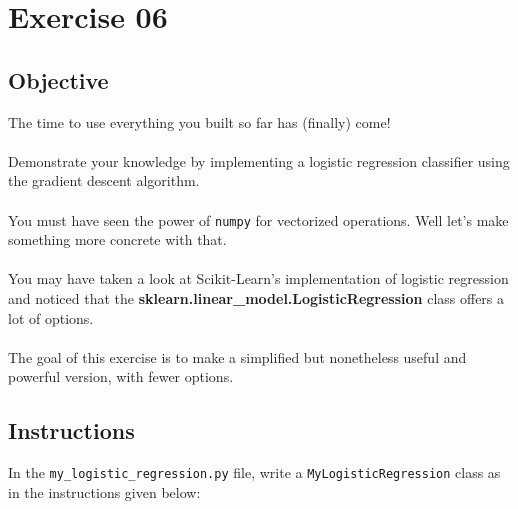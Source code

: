 \chapter{Exercise 06}
%
{}
\makeheaderfilesforbidden

\section*{Objective}
The time to use everything you built so far has (finally) come!\\
\\
Demonstrate your knowledge by implementing a logistic regression classifier using 
the gradient descent algorithm.\\
\\
You must have seen the power of \texttt{numpy} for vectorized operations.
 Well let's make something more concrete with that.\\
\\
You may have taken a look at Scikit-Learn's implementation of logistic regression 
and noticed that the \textbf{sklearn.linear\_model.LogisticRegression} class 
offers a lot of options.\\
\\
The goal of this exercise is to make a simplified but nonetheless useful and powerful
 version, with fewer options.\\
\newpage
\section*{Instructions}
In the \texttt{my\_logistic\_regression.py} file, write a \texttt{MyLogisticRegression} 
class as in the instructions given below:\\

